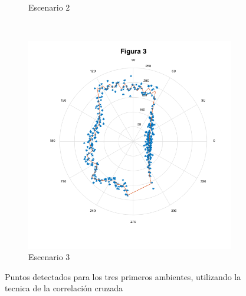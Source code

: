 \documentclass[letterpaper,11pt]{article}
\begin{document}
\begin{figure}[H]
\begin{subfigure}[b]{0.3\textwidth}
        \caption{Escenario 2}
    \end{subfigure}
    ~ %
    \begin{subfigure}[b]{0.3\textwidth}
        \includegraphics[width=\textwidth]{img/parte_b/figura3.png}
        \caption{Escenario 3}
    \end{subfigure}
    
    \caption{Puntos detectados para los tres primeros ambientes, utilizando la tecnica de la correlación cruzada}
    \label{parteb1}
\end{figure}


\newpage
\end{document}
